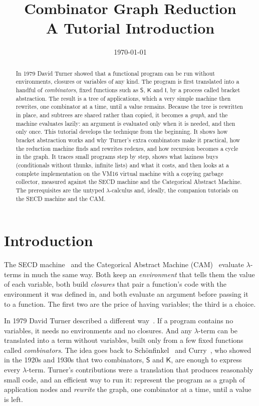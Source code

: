 \documentclass[11pt,a4paper]{article}
\title{Combinator Graph Reduction\\[4pt]\large A Tutorial Introduction}
\author{}
\date{\today}
\newcommand{\cmb}[1]{\textsf{#1}}
\newcommand{\I}{\cmb{I}}
\newcommand{\K}{\cmb{K}}
\newcommand{\Sc}{\cmb{S}}
\theoremstyle{definition}
\theoremstyle{plain}
\begin{document}
\maketitle

\begin{abstract}
\noindent
In 1979 David Turner showed that a functional program can be run without
environments, closures or variables of any kind. The program is first
translated into a handful of \emph{combinators}, fixed functions such as
$\Sc$, $\K$ and $\I$, by a process called bracket abstraction. The result is a
tree of applications, which a very simple machine then rewrites, one
combinator at a time, until a value remains. Because the tree is rewritten in
place, and subtrees are shared rather than copied, it becomes a
\emph{graph}, and the machine evaluates lazily: an argument is evaluated only
when it is needed, and then only once. This tutorial develops the technique
from the beginning. It shows how bracket abstraction works and why Turner's
extra combinators make it practical, how the reduction machine finds and
rewrites redexes, and how recursion becomes a cycle in the graph. It traces
small programs step by step, shows what laziness buys (conditionals without
thunks, infinite lists) and what it costs, and then looks at a complete
implementation on the VM16 virtual machine with a copying garbage collector,
measured against the SECD machine and the Categorical Abstract Machine. The
prerequisites are the untyped $\lambda$-calculus and, ideally, the companion
tutorials on the SECD machine and the CAM.
\end{abstract}

\tableofcontents

\section{Introduction}

The SECD machine~\cite{landin64} and the Categorical Abstract Machine
(CAM)~\cite{cam87} evaluate $\lambda$-terms in much the same way. Both keep an
\emph{environment} that tells them the value of each variable, both build
\emph{closures} that pair a function's code with the environment it was
defined in, and both evaluate an argument before passing it to a function.
The first two are the price of having variables; the third is a choice.

In 1979 David Turner described a different way~\cite{turner79}. If a program
contains no variables, it needs no environments and no closures. And any
$\lambda$-term can be translated into a term without variables, built only
from a few fixed functions called \emph{combinators}. The idea goes back to
Schönfinkel~\cite{schonfinkel24} and Curry~\cite{curryfeys58}, who showed in
the 1920s and 1930s that two combinators, $\Sc$ and $\K$, are enough to
express every $\lambda$-term. Turner's contributions were a translation that
produces reasonably small code, and an efficient way to run it: represent the
program as a graph of application nodes and \emph{rewrite} the graph, one
combinator at a time, until a value is left.
\end{document}
